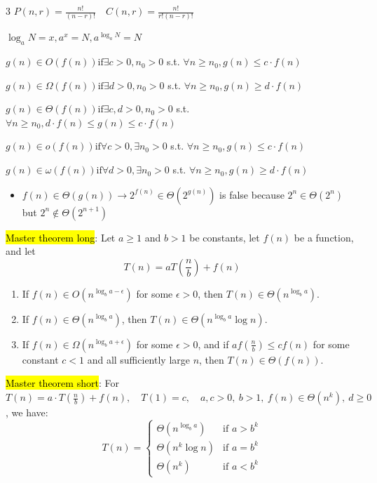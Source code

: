 \documentclass[letterpaper]{article}
\begin{document}
\tiny

\begin{multicols*}{3}
    $P(n, r)=\frac{n !}{(n-r) !}\quad C(n, r)=\frac{n !}{r !(n-r) !}$

    $\log_a N = x, a^x = N, a^{\log_a N} = N$

    $g(n) \in O(f(n)) \text{if} \exists c > 0, n_0 > 0$ s.t. $\forall n \geq n_0, g(n) \leq c \cdot f(n)$

    $g(n) \in \Omega(f(n)) \text{if} \exists d > 0, n_0 > 0$ s.t. $\forall n \geq n_0, g(n) \geq d \cdot f(n)$

    $g(n) \in \Theta(f(n)) \text{if} \exists c, d > 0, n_0 > 0$ s.t. $\forall n \geq n_0, d \cdot f(n) \leq g(n) \leq c \cdot f(n)$

    $g(n) \in o(f(n)) \text{if} \forall c > 0, \exists n_0 > 0$ s.t. $\forall n \geq n_0, g(n) \leq c \cdot f(n)$

    $g(n) \in \omega(f(n)) \text{if} \forall d > 0, \exists n_0 > 0$ s.t. $\forall n \geq n_0, g(n) \geq d \cdot f(n)$

    \begin{itemize}
        \item $f(n)\in\Theta(g(n)) \to 2^{f(n)}\in\Theta(2^{g(n)})$ is false because $2^{n}\in\Theta(2^{n})$ but $2^{n}\notin\Theta(2^{n+1})$
    \end{itemize}

    \hl{Master theorem long}: Let $a\geq 1$ and $b>1$ be constants, let $f(n)$ be a function, and let
    \[T(n)=a T\left(\frac{n}{b}\right)+f(n)\]
    \begin{enumerate}
        \item If $f(n) \in O\left(n^{\log_b a-\epsilon}\right)$ for some $\epsilon>0$, then $T(n) \in \Theta\left(n^{\log_b a}\right)$.
        \item If $f(n) \in \Theta\left(n^{\log_b a}\right)$, then $T(n) \in \Theta\left(n^{\log_b a} \log n\right)$.
        \item If $f(n) \in \Omega\left(n^{\log_b a+\epsilon}\right)$ for some $\epsilon>0$, and if $a f\left(\frac{n}{b}\right) \leq c f(n)$ for some constant $c<1$ and all sufficiently large $n$, then $T(n) \in \Theta(f(n))$.
    \end{enumerate}

    \hl{Master theorem short}: For $T(n) = a\cdot T(\frac{n}{b}) + f(n),\quad T(1) = c,\quad a, c > 0,\ b > 1,\ f(n)\in \Theta(n^k),\ d\geq 0$, we have:
    \[T(n) = \begin{cases}
            \Theta(n^{\log_b a}) & \text{if } a > b^k \\
            \Theta(n^k \log n)   & \text{if } a = b^k \\
            \Theta(n^k)          & \text{if } a < b^k
        \end{cases}\]


\end{multicols*}
\end{document}
